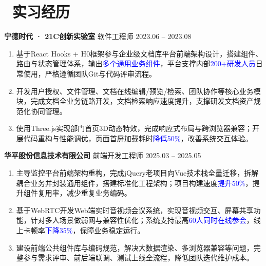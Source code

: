 ﻿\documentclass[10pt,a4paper]{ctexart}
\newcommand{\sect}[2]{%
  \section{\texorpdfstring{\makebox[\widthof{\faGraduationCap}][c]{{\mdseries\color{themecolor}#1}}\ #2}{#2}}
}
\begin{document}
\sect{\faUniversity}{实习经历}
\vspace{4pt}
\noindent\textbf{宁德时代 · 21C创新实验室} \hfill 软件工程师 \hfill 2023.06 -- 2023.08
\begin{enumerate}[topsep=0pt, partopsep=1pt, itemsep=2pt, parsep=0pt]
  \item 基于React Hooks + H0框架参与企业级文档库平台前端架构设计，搭建组件、路由与状态管理体系，输出\textcolor{blue}{多个通用业务组件}，平台支撑内部\textcolor{blue}{200+研发人员}日常使用，严格遵循团队Git与代码评审流程。
  \item 开发用户授权、文件管理、文档在线编辑/预览/检索、团队协作等核心业务模块，完成文档全业务链路开发，文档检索响应速度提升，支撑研发文档资产规范化协同管理。
  \item 使用Three.js实现部门首页3D动态特效，完成响应式布局与跨浏览器兼容；开展代码重构与性能调优，页面首屏加载耗时\textcolor{blue}{降低50\%}，改善系统交互体验。
\end{enumerate}
\vspace{4pt}

\noindent\textbf{华平股份信息技术有限公司} \hfill 前端开发工程师 \hfill 2025.03 -- 2025.05
\begin{enumerate}[topsep=0pt, partopsep=1pt, itemsep=2pt, parsep=0pt]
  \item 主导监控平台前端架构重构，完成jQuery老项目向Vue技术栈全量迁移，拆解耦合业务并封装通用组件，搭建标准化工程架构；项目构建速度\textcolor{blue}{提升50\%}，提升组件复用率，减少重复业务编码。
  \item 基于WebRTC开发Web端实时音视频会议系统，实现音视频交互、屏幕共享功能，针对多人场景做弱网与兼容性优化；系统支持最高\textcolor{blue}{60人同时在线参会}，线上卡顿率\textcolor{blue}{下降35\%}，保障业务稳定运行。
  \item 建设前端公共组件库与编码规范，解决大数据渲染、多浏览器兼容等问题，完整参与需求评审、前后端联调、测试上线全流程，降低团队迭代维护成本。
\end{enumerate}
\end{document}
